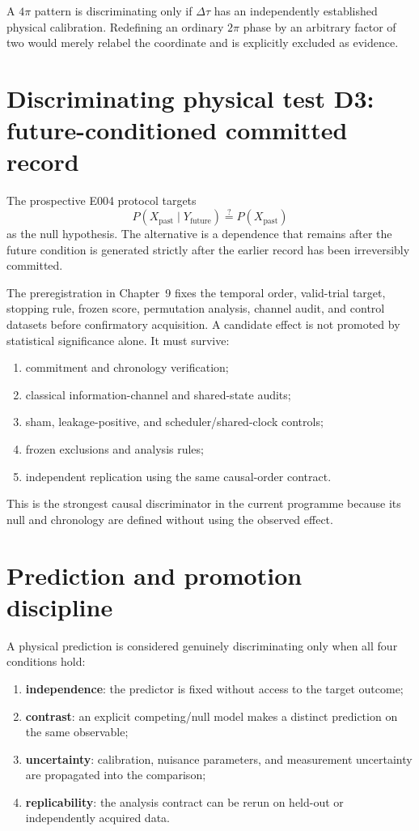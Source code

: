 \documentclass[11pt]{book}
\begin{document}
A \(4\pi\) pattern is discriminating only if \(\Delta\tau\) has an independently established physical calibration. Redefining an ordinary \(2\pi\) phase by an arbitrary factor of two would merely relabel the coordinate and is explicitly excluded as evidence.

\section{Discriminating physical test D3: future-conditioned committed record}

The prospective E004 protocol targets
\[
\boxed{
P(X_{\mathrm{past}}\mid Y_{\mathrm{future}})
\stackrel{?}{=}
P(X_{\mathrm{past}})
}
\]
as the null hypothesis. The alternative is a dependence that remains after the future condition is generated strictly after the earlier record has been irreversibly committed.

The preregistration in Chapter~9 fixes the temporal order, valid-trial target, stopping rule, frozen score, permutation analysis, channel audit, and control datasets before confirmatory acquisition. A candidate effect is not promoted by statistical significance alone. It must survive:
\begin{enumerate}
\item commitment and chronology verification;
\item classical information-channel and shared-state audits;
\item sham, leakage-positive, and scheduler/shared-clock controls;
\item frozen exclusions and analysis rules;
\item independent replication using the same causal-order contract.
\end{enumerate}
This is the strongest causal discriminator in the current programme because its null and chronology are defined without using the observed effect.

\section{Prediction and promotion discipline}

A physical prediction is considered genuinely discriminating only when all four conditions hold:
\begin{enumerate}
\item \textbf{independence}: the predictor is fixed without access to the target outcome;
\item \textbf{contrast}: an explicit competing/null model makes a distinct prediction on the same observable;
\item \textbf{uncertainty}: calibration, nuisance parameters, and measurement uncertainty are propagated into the comparison;
\item \textbf{replicability}: the analysis contract can be rerun on held-out or independently acquired data.
\end{enumerate}
\end{document}
